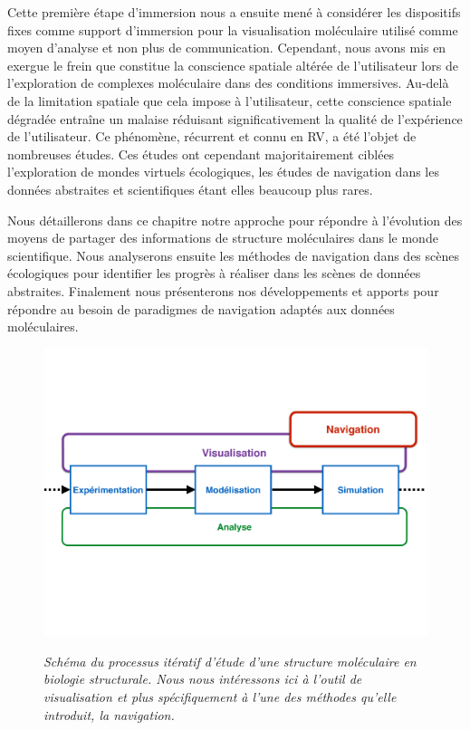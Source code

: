 Cette première étape d'immersion nous a ensuite mené à considérer les dispositifs fixes comme support d'immersion pour la visualisation moléculaire utilisé comme moyen d'analyse et non plus de communication. 
Cependant, nous avons mis en exergue le frein que constitue la conscience spatiale altérée de l'utilisateur lors de l'exploration de complexes moléculaire dans des conditions immersives. Au-delà de la limitation spatiale que cela impose à l'utilisateur, cette conscience spatiale dégradée entraîne un malaise réduisant significativement la qualité de l'expérience de l'utilisateur.
Ce phénomène, récurrent et connu en RV, a été l'objet de nombreuses études. Ces études ont cependant majoritairement ciblées l'exploration de mondes virtuels écologiques, les études de navigation dans les données abstraites et scientifiques étant elles beaucoup plus rares. 

Nous détaillerons dans ce chapitre notre approche pour répondre à l'évolution des moyens de partager des informations de structure moléculaires dans le monde scientifique. Nous analyserons ensuite les méthodes de navigation dans des scènes écologiques pour identifier les progrès à réaliser dans les scènes de données abstraites. Finalement nous présenterons nos développements et apports pour répondre au besoin de paradigmes de navigation adaptés aux données moléculaires.

\begin{figure}
  \centering
  {\includegraphics[width=1.0\linewidth]{./figures/ch3/process_bio_struct_navigation}}
    \caption[Schéma du processus itératif d'étude d'une structure moléculaire en biologie structurale.]{\it Schéma du processus itératif d'étude d'une structure moléculaire en biologie structurale. Nous nous intéressons ici à l'outil de visualisation et plus spécifiquement à l'une des méthodes qu'elle introduit, la navigation.}
  \label{Fig:process_bio_struct_navigation}
  \hspace{0.3cm}
\end{figure}

